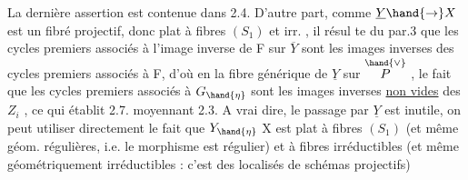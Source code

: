 La dernière assertion est contenue dans 2.4. D'autre part, comme
$\underline{Y} \hand{\rightarrow} X$ est un fibré projectif, donc plat à fibres $(S_1)$ et irr. , il résul
te du par.3 que les cycles premiers associés à l'image inverse  de F sur
$\overline{Y}$ sont les images inverses  des cycles premiers associés à F,
d'où en   la fibre générique  de $\underline{Y}$ sur $\overset{\hand{\vee}}{P}$ , le fait que les
cycles premiers associés à $G_{\hand{\eta}}$ sont les images inverses \uline{non vides} des $Z_i$ ,
ce qui établit 2.7. moyennant 2.3. A vrai dire, le passage par $\underline{Y}$ est
inutile, on peut utiliser directement le fait que $Y_{\hand{\eta}}$ \hand{$\longrightarrow$} X est plat à
fibres $(S_1)$ (et même géom. régulières, i.e. le morphisme est régulier)
et à fibres irréductibles (et même géométriquement irréductibles : c'est
des localisés de schémas projectifs)\hand{;} 


